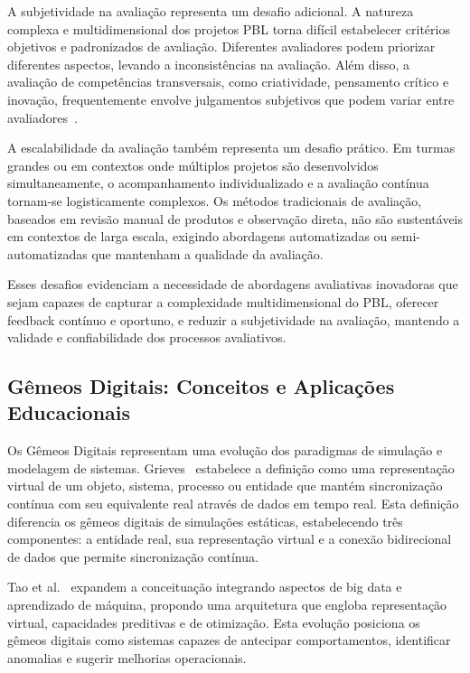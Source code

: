 \documentclass[english, spanish, brazilian]{modelo_dt}
\begin{document}
A subjetividade na avaliação representa um desafio adicional. A natureza complexa e multidimensional dos projetos PBL torna difícil estabelecer critérios objetivos e padronizados de avaliação. Diferentes avaliadores podem priorizar diferentes aspectos, levando a inconsistências na avaliação. Além disso, a avaliação de competências transversais, como criatividade, pensamento crítico e inovação, frequentemente envolve julgamentos subjetivos que podem variar entre avaliadores~\parencite{zhang2023effectiveness}.

A escalabilidade da avaliação também representa um desafio prático. Em turmas grandes ou em contextos onde múltiplos projetos são desenvolvidos simultaneamente, o acompanhamento individualizado e a avaliação contínua tornam-se logisticamente complexos. Os métodos tradicionais de avaliação, baseados em revisão manual de produtos e observação direta, não são sustentáveis em contextos de larga escala, exigindo abordagens automatizadas ou semi-automatizadas que mantenham a qualidade da avaliação.

Esses desafios evidenciam a necessidade de abordagens avaliativas inovadoras que sejam capazes de capturar a complexidade multidimensional do PBL, oferecer feedback contínuo e oportuno, e reduzir a subjetividade na avaliação, mantendo a validade e confiabilidade dos processos avaliativos.

\subsection{Gêmeos Digitais: Conceitos e Aplicações Educacionais}

Os Gêmeos Digitais representam uma evolução dos paradigmas de simulação e modelagem de sistemas\@. Grieves\@~\parencite{grieves2014digital} estabelece a definição como uma representação virtual de um objeto, sistema, processo ou entidade que mantém sincronização contínua com seu equivalente real através de dados em tempo real\@. Esta definição diferencia os gêmeos digitais de simulações estáticas, estabelecendo três componentes: a entidade real, sua representação virtual e a conexão bidirecional de dados que permite sincronização contínua\@.

Tao et al.\@~\parencite{tao2018digital} expandem a conceituação integrando aspectos de big data e aprendizado de máquina, propondo uma arquitetura que engloba representação virtual, capacidades preditivas e de otimização\@. Esta evolução posiciona os gêmeos digitais como sistemas capazes de antecipar comportamentos, identificar anomalias e sugerir melhorias operacionais\@.
\end{document}
